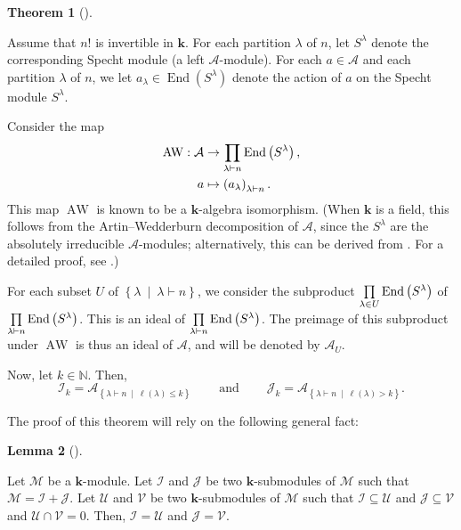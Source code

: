\documentclass[numbers=enddot,12pt,final,onecolumn,notitlepage]{scrartcl}%
\numberwithin{exer}{subsection}
\theoremstyle{definition}
\newtheorem{theo}{Theorem}[subsection]
\newenvironment{theorem}[1][]
{\begin{theo}[#1]\begin{leftbar}}
{\end{leftbar}\end{theo}}
\newtheorem{lem}[theo]{Lemma}
\newenvironment{lemma}[1][]
{\begin{lem}[#1]\begin{leftbar}}
{\end{leftbar}\end{lem}}
\let\prodnonlimits\prod
\renewcommand{\prod}{\prodnonlimits\limits}
\begin{document}
\begin{theorem}
\label{thm.IJ.rep}Assume that $n!$ is invertible in $\mathbf{k}$. For each
partition $\lambda$ of $n$, let $S^{\lambda}$ denote the corresponding Specht
module (a left $\mathcal{A}$-module). For each $a\in\mathcal{A}$ and each
partition $\lambda$ of $n$, we let $a_{\lambda}\in\operatorname*{End}\left(
S^{\lambda}\right)  $ denote the action of $a$ on the Specht module
$S^{\lambda}$.

Consider the map%
\begin{align*}
\operatorname*{AW}:\mathcal{A}  &  \rightarrow\prod\limits_{\lambda\vdash
n}\operatorname*{End}\left(  S^{\lambda}\right)  ,\\
a  &  \mapsto\left(  a_{\lambda}\right)  _{\lambda\vdash n}.
\end{align*}
This map $\operatorname*{AW}$ is known to be a $\mathbf{k}$-algebra
isomorphism. (When $\mathbf{k}$ is a field, this follows from the
Artin--Wedderburn decomposition of $\mathcal{A}$, since the $S^{\lambda}$ are
the absolutely irreducible $\mathcal{A}$-modules; alternatively, this can be
derived from \cite[\S 17, Theorem 12]{Ruther48}. For a detailed proof, see
\cite[Theorem 5.14.1]{sga}.)

For each subset $U$ of $\left\{  \lambda\ \mid\ \lambda\vdash n\right\}  $, we
consider the subproduct $\prod\limits_{\lambda\in U}\operatorname*{End}\left(
S^{\lambda}\right)  $ of $\prod\limits_{\lambda\vdash n}\operatorname*{End}%
\left(  S^{\lambda}\right)  $. This is an ideal of $\prod\limits_{\lambda
\vdash n}\operatorname*{End}\left(  S^{\lambda}\right)  $. The preimage of
this subproduct under $\operatorname*{AW}$ is thus an ideal of $\mathcal{A}$,
and will be denoted by $\mathcal{A}_{U}$.

Now, let $k\in\mathbb{N}$. Then,%
\[
\mathcal{I}_{k}=\mathcal{A}_{\left\{  \lambda\vdash n\ \mid\ \ell\left(
\lambda\right)  \leq k\right\}  }\ \ \ \ \ \ \ \ \ \ \text{and}%
\ \ \ \ \ \ \ \ \ \ \mathcal{J}_{k}=\mathcal{A}_{\left\{  \lambda\vdash
n\ \mid\ \ell\left(  \lambda\right)  >k\right\}  }.
\]

\end{theorem}

The proof of this theorem will rely on the following general fact:

\begin{lemma}
\label{lem.IUJV}Let $\mathcal{M}$ be a $\mathbf{k}$-module. Let $\mathcal{I}$
and $\mathcal{J}$ be two $\mathbf{k}$-submodules of $\mathcal{M}$ such that
$\mathcal{M}=\mathcal{I}+\mathcal{J}$. Let $\mathcal{U}$ and $\mathcal{V}$ be
two $\mathbf{k}$-submodules of $\mathcal{M}$ such that $\mathcal{I}%
\subseteq\mathcal{U}$ and $\mathcal{J}\subseteq\mathcal{V}$ and $\mathcal{U}%
\cap\mathcal{V}=0$. Then, $\mathcal{I}=\mathcal{U}$ and $\mathcal{J}%
=\mathcal{V}$.
\end{lemma}
\end{document}
